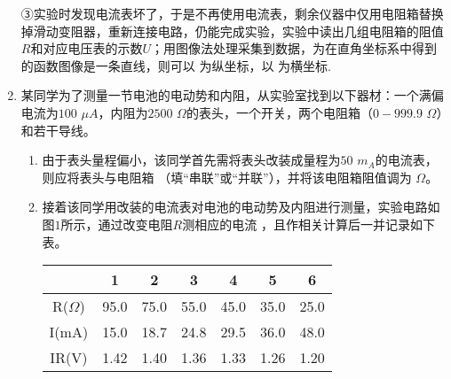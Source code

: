 \begin{enumerate}[leftmargin=0em]
③实验时发现电流表坏了，于是不再使用电流表，剩余仪器中仅用电阻箱替换掉滑动变阻器，重新连接电路，仍能完成实验，实验中读出几组电阻箱的阻值$ R $和对应电压表的示数$ U $；用图像法处理采集到数据，为在直角坐标系中得到的函数图像是一条直线，则可以  
为纵坐标，以  
为横坐标.









\newpage
\item 
{}
某同学为了测量一节电池的电动势和内阻，从实验室找到以下器材：一个满偏电流为$ 100 $ $ \mu A $，内阻为$ 2500 $ $ \Omega $的表头，一个开关，两个电阻箱（$ 0 - 999.9 $ $ \Omega $）和若干导线。
\begin{enumerate}
\renewcommand{\labelenumi}{\arabic{enumi}.}
\item
由于表头量程偏小，该同学首先需将表头改装成量程为$ 50 $ $ m_{A} $的电流表，则应将表头与电阻箱  
（填“串联”或“并联”），并将该电阻箱阻值调为  
$ \Omega $。

\item 
接着该同学用改装的电流表对电池的电动势及内阻进行测量，实验电路如图$ 1 $所示，通过改变电阻$ R $测相应的电流  ，且作相关计算后一并记录如下表。
\begin{figure}[h!]
\centering

\end{figure}

\begin{table}[h!]
\centering 
\begin{tabular}{|c|c|c|c|c|c|c|}
\hline 
& 1 & 2 & 3 & 4 & 5 & 6
 \\
\hline
R($ \Omega $) & 95.0 & 75.0 & 55.0 & 45.0 & 35.0 & 25.0
 \\
\hline
I(mA) & 15.0 & 18.7 & 24.8 & 29.5 & 36.0 & 48.0
 \\
\hline
IR(V) & 1.42 & 1.40 & 1.36 & 1.33 & 1.26 & 1.20\\ 
\hline 
\end{tabular} \qquad 
 
\end{table} 




\end{enumerate}
\end{enumerate}
